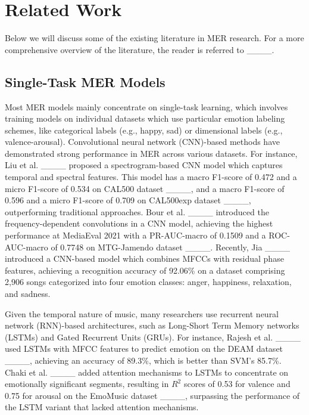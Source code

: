 \section{Related Work}
\label{sec:related}

Below we will discuss some of the existing literature in MER research. For a more comprehensive overview of the literature, the reader is referred to ____.

\subsection{Single-Task MER Models}
Most MER models mainly concentrate on single-task learning, which involves training models on individual datasets which use particular emotion labeling schemes, like categorical labels (e.g., happy, sad) or dimensional labels (e.g., valence-arousal). Convolutional neural network (CNN)-based methods have demonstrated strong performance in MER across various datasets. For instance, Liu et al. ____ proposed a spectrogram-based CNN model which captures temporal and spectral features. This model has a macro F1-score of 0.472 and a micro F1-score of 0.534 on CAL500 dataset ____, and a macro F1-score of 0.596 and a micro F1-score of 0.709 on CAL500exp dataset ____, outperforming traditional approaches. Bour et al. ____ introduced the frequency-dependent convolutions in a CNN model, achieving the highest performance at MediaEval 2021 with a PR-AUC-macro of 0.1509 and a ROC-AUC-macro of 0.7748 on MTG-Jamendo dataset ____. Recently, Jia ____ introduced a CNN-based model which combines MFCCs with residual phase features, achieving a recognition accuracy of 92.06\% on a dataset comprising 2,906 songs categorized into four emotion classes: anger, happiness, relaxation, and sadness.

Given the temporal nature of music, many researchers use recurrent neural network (RNN)-based architectures, such as Long-Short Term Memory networks (LSTMs) and Gated Recurrent Units (GRUs). For instance, Rajesh et al. ____ used LSTMs with MFCC features to predict emotion on the DEAM dataset ____, achieving an accuracy of 89.3\%, which is better than SVM’s 85.7\%. Chaki et al. ____ added attention mechanisms to LSTMs to concentrate on emotionally significant segments, resulting in \(R^2\) scores of 0.53 for valence and 0.75 for arousal on the EmoMusic dataset ____, surpassing the performance of the LSTM variant that lacked attention mechanisms.



